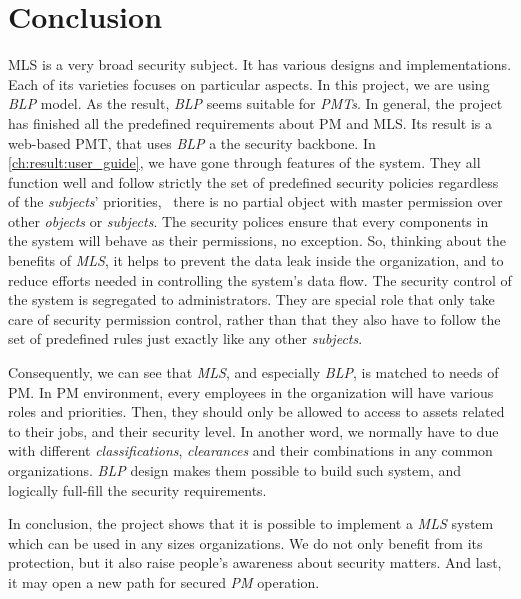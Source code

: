 
\chapter{Conclusion} %

\label{ch:conclusion} 

MLS is a very broad security subject.
It has various designs and implementations.
Each of its varieties focuses on particular aspects.
In this project, we are using \emph{BLP} model.
As the result, \emph{BLP} seems suitable for \emph{PMTs}.
In general, the project has finished all the predefined requirements about PM and MLS.
Its result is a web-based PMT, that uses \emph{BLP} a the security backbone.
In \autoref{ch:result:user_guide}, we have gone through features of the system.
They all function well and follow strictly the set of predefined security policies regardless of the \emph{subjects}' priorities, \ie\ there is no partial object with master permission over other \emph{objects} or \emph{subjects}.
The security polices ensure that every components in the system will behave as their permissions, no exception.
So, thinking about the benefits of \emph{MLS}, it helps to prevent the data leak inside the organization, and to reduce efforts needed in controlling the system's data flow.
The security control of the system is segregated to administrators.
They are special role that only take care of security permission control, rather than that they also have to follow the set of predefined rules just exactly like any other \emph{subjects}.

Consequently, we can see that \emph{MLS}, and especially \emph{BLP}, is matched to needs of PM.
In PM environment, every employees in the organization will have various roles and priorities.
Then, they should only be allowed to access to assets related to their jobs, and their security level.
In another word, we normally have to due with different \emph{classifications}, \emph{clearances} and their combinations in any common organizations.
\emph{BLP} design makes them possible to build such system, and logically full-fill the security requirements.

In conclusion, the project shows that it is possible to implement a \emph{MLS} system which can be used in any sizes organizations.
We do not only benefit from its protection, but it also raise people's awareness about security matters.
And last, it may open a new path for secured \emph{PM} operation.
